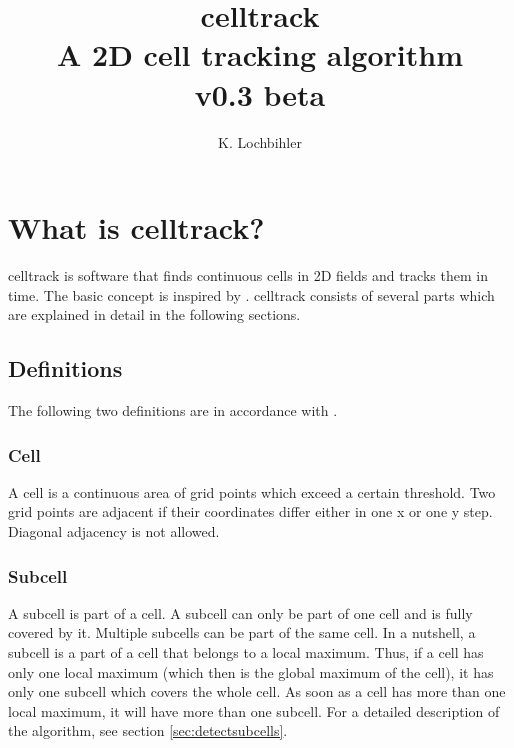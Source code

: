 \documentclass{scrartcl}
\title{celltrack\\
	A 2D cell tracking algorithm\\ \medskip
	v0.3 beta}
\author{K. Lochbihler}
\begin{document}
	
\maketitle

\section{What is celltrack?}
celltrack is software that finds continuous cells in 2D fields and tracks them in time. The basic concept is inspired by \cite{moseley2013}. celltrack consists of several parts which are explained in detail in the following sections.

\subsection{Definitions}
The following two definitions are in accordance with \cite{moseley2013}.

\subsubsection*{Cell}
A cell is a continuous area of grid points which exceed a certain threshold. Two grid points are adjacent if their coordinates differ either in one x or one y step. Diagonal adjacency is not allowed.

\subsubsection*{Subcell}
A subcell is part of a cell. A subcell can only be part of one cell and is fully covered by it. Multiple subcells can be part of the same cell. In a nutshell, a subcell is a part of a cell that belongs to a local maximum. Thus, if a cell has only one local maximum (which then is the global maximum of the cell), it has only one subcell which covers the whole cell. As soon as a cell has more than one local maximum, it will have more than one subcell. For a detailed description of the algorithm, see section \ref{sec:detectsubcells}.
\end{document}
